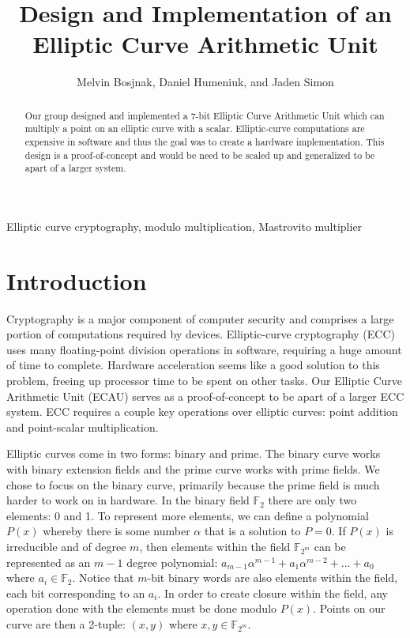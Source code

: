 \documentclass{IEEEtran}
\begin{document}
\title{Design and Implementation of an Elliptic Curve Arithmetic Unit}

\author{Melvin Bosjnak, Daniel Humeniuk, and Jaden Simon}

\maketitle

\begin{abstract}

Our group designed and implemented a 7-bit Elliptic Curve Arithmetic Unit which can multiply a point on an elliptic curve with a scalar. Elliptic-curve computations are expensive in software and thus the goal was to create a hardware implementation. This design is a proof-of-concept and would be need to be scaled up and generalized to be apart of a larger system. 

\end{abstract}

\begin{IEEEkeywords}
Elliptic curve cryptography, modulo multiplication, Mastrovito multiplier

\end{IEEEkeywords}

\section{Introduction}

Cryptography is a major component of computer security and comprises a large portion of computations required by devices. Elliptic-curve cryptography (ECC) uses many floating-point division operations in software, requiring a huge amount of time to complete. Hardware acceleration seems like a good solution to this problem, freeing up processor time to be spent on other tasks. Our Elliptic Curve Arithmetic Unit (ECAU) serves as a proof-of-concept to be apart of a larger ECC system. ECC requires a couple key operations over elliptic curves: point addition and point-scalar multiplication.

Elliptic curves come in two forms: binary and prime. The binary curve works with binary extension fields and the prime curve works with prime fields. We chose to focus on the binary curve, primarily because the prime field is much harder to work on in hardware. In the binary field $\mathbb{F}_2$ there are only two elements: 0 and 1. To represent more elements, we can define a polynomial $P(x)$ whereby there is some number $\alpha$ that is a solution to $P=0$. If $P(x)$ is irreducible and of degree $m$, then elements within the field $\mathbb{F}_{2^m}$ can be represented as an $m-1$ degree polynomial: $a_{m-1}\alpha^{m-1} + a_1\alpha^{m-2} + ... + a_{0}$ where $a_{i} \in \mathbb{F}_2$. Notice that $m$-bit binary words are also elements within the field, each bit corresponding to an $a_{i}$. In order to create closure within the field, any operation done with the elements must be done modulo $P(x)$. Points on our curve are then a 2-tuple: $(x, y)$ where $x, y \in \mathbb{F}_{2^m}$.
\end{document}

